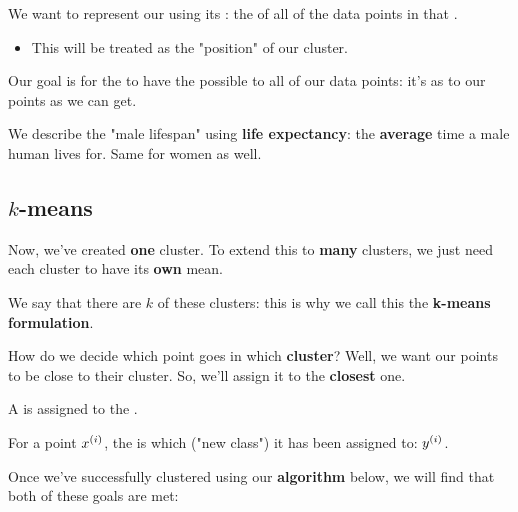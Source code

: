         \begin{definition}
            We want to represent our  using its : the  of all of the data points in that .

            \begin{itemize}
                \item This  will be treated as the "position" of our cluster.
            \end{itemize}
           

            \subsecdiv
             
            Our goal is for the  to have the  possible to all of our data points: it's as  to our points as we can get.
        \end{definition}
        
        \miniex We describe the "male lifespan" using \textbf{life expectancy}: the \textbf{average} time a male human lives for. Same for women as well.
         
    \subsection{$k$-means}
    
        Now, we've created \textbf{one} cluster. To extend this to \textbf{many} clusters, we just need each cluster to have its \textbf{own} mean.
        
        We say that there are $k$ of these clusters: this is why we call this the \textbf{k-means formulation}.
        
        How do we decide which point goes in which \textbf{cluster}? Well, we want our points to be close to their cluster. So, we'll assign it to the \textbf{closest} one.\\
        
        \begin{concept}
            A  is assigned to the  .
            
            For a point $x^{(i)}$, the  is which  ("new class") it has been assigned to: $y^{(i)}$.
        \end{concept}
        
        Once we've successfully clustered using our \textbf{algorithm} below, we will find that both of these goals are met:
        
